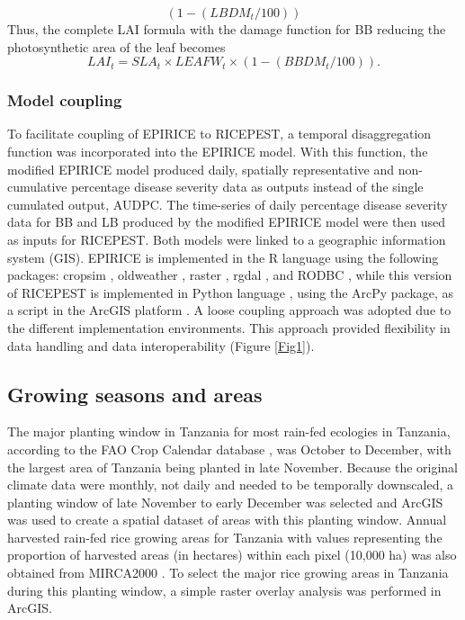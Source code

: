     \begin{equation}
    (1-(LBDM_t /100))
    \label{LBDM}
    \end{equation}
    Thus, the complete LAI formula with the damage function for BB reducing the photosynthetic area of the leaf becomes
     \begin{equation}
    LAI_t = SLA_t \times LEAFW_t \times (1-(BBDM_t / 100)).
    \label{LAIBBDM}
    \end{equation}
    
    \subsubsection{Model coupling}
    \label{model_coupling}
    To facilitate coupling of EPIRICE to RICEPEST, a temporal disaggregation function was incorporated into the EPIRICE model. With this function, the modified EPIRICE model produced daily, spatially representative and non-cumulative percentage disease severity data as outputs instead of the single cumulated output, AUDPC. The time-series of daily percentage disease severity data for BB and LB produced by the modified EPIRICE model were then used as inputs for RICEPEST. Both models were linked to a geographic information system (GIS). EPIRICE is implemented in the R language using the following packages: cropsim \citep{Hijmans2009}, oldweather \citep{Hijmans2009}, raster \citep{Hijmans2014}, rgdal \citep{Bivand2014}, and RODBC \citep{Ripley2013}, while this version of RICEPEST is implemented in Python language \citep{python}, using the ArcPy package, as a script in the ArcGIS platform \citep{ESRI2011}. A loose coupling approach was adopted due to the different implementation environments. This approach provided flexibility in data handling and data interoperability (Figure \ref{Fig1}).
        
    \subsection{Growing seasons and areas}
    \label{growings_seasons}
    The major planting window in Tanzania for most rain-fed ecologies in Tanzania, according to the FAO Crop Calendar database \citep{FAOCropCalendar}, was October to December, with the largest area of Tanzania being planted in late November. Because the original climate data were monthly, not daily and needed to be temporally downscaled, a planting window of late November to early December was selected and ArcGIS was used to create a spatial dataset of areas with this planting window. Annual harvested rain-fed rice growing areas for Tanzania with values representing the proportion of harvested areas (in hectares) within each pixel (10,000 ha) was also obtained from MIRCA2000 \citep{Portmann2010}. To select the major rice growing areas in Tanzania during this planting window, a simple raster overlay analysis was performed in ArcGIS.
    
